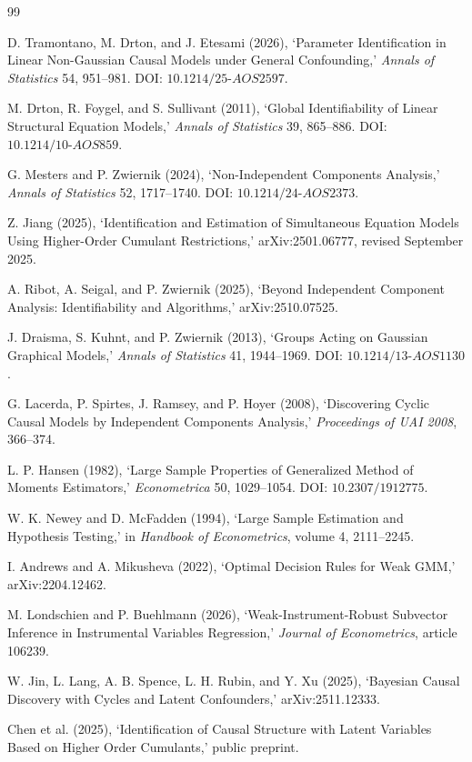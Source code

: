 \documentclass{article}
\begin{document}
\begin{thebibliography}{99}

   D. Tramontano, M. Drton, and J. Etesami (2026), `Parameter Identification in Linear Non-Gaussian Causal Models under General Confounding,' \emph{Annals of Statistics} 54, 951--981. DOI: \(10.1214/25\text{-}AOS2597\).

   M. Drton, R. Foygel, and S. Sullivant (2011), `Global Identifiability of Linear Structural Equation Models,' \emph{Annals of Statistics} 39, 865--886. DOI: \(10.1214/10\text{-}AOS859\).

   G. Mesters and P. Zwiernik (2024), `Non-Independent Components Analysis,' \emph{Annals of Statistics} 52, 1717--1740. DOI: \(10.1214/24\text{-}AOS2373\).

   Z. Jiang (2025), `Identification and Estimation of Simultaneous Equation Models Using Higher-Order Cumulant Restrictions,' arXiv:2501.06777, revised September 2025.

   A. Ribot, A. Seigal, and P. Zwiernik (2025), `Beyond Independent Component Analysis: Identifiability and Algorithms,' arXiv:2510.07525.

   J. Draisma, S. Kuhnt, and P. Zwiernik (2013), `Groups Acting on Gaussian Graphical Models,' \emph{Annals of Statistics} 41, 1944--1969. DOI: \(10.1214/13\text{-}AOS1130\).

   G. Lacerda, P. Spirtes, J. Ramsey, and P. Hoyer (2008), `Discovering Cyclic Causal Models by Independent Components Analysis,' \emph{Proceedings of UAI 2008}, 366--374.

   L. P. Hansen (1982), `Large Sample Properties of Generalized Method of Moments Estimators,' \emph{Econometrica} 50, 1029--1054. DOI: \(10.2307/1912775\).

   W. K. Newey and D. McFadden (1994), `Large Sample Estimation and Hypothesis Testing,' in \emph{Handbook of Econometrics}, volume 4, 2111--2245.

   I. Andrews and A. Mikusheva (2022), `Optimal Decision Rules for Weak GMM,' arXiv:2204.12462.

   M. Londschien and P. Buehlmann (2026), `Weak-Instrument-Robust Subvector Inference in Instrumental Variables Regression,' \emph{Journal of Econometrics}, article 106239.

   W. Jin, L. Lang, A. B. Spence, L. H. Rubin, and Y. Xu (2025), `Bayesian Causal Discovery with Cycles and Latent Confounders,' arXiv:2511.12333.

   Chen et al. (2025), `Identification of Causal Structure with Latent Variables Based on Higher Order Cumulants,' public preprint.

\end{thebibliography}
\end{document}
